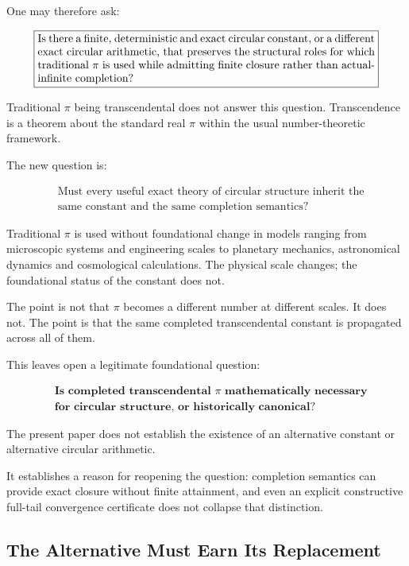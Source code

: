 \documentclass[11pt,a4paper]{article}
\begin{document}
One may therefore ask:

\[
\boxed{
\begin{minipage}{0.88\linewidth}
Is there a finite, deterministic and exact circular constant, or a
different exact circular arithmetic, that preserves the structural
roles for which traditional \(\pi\) is used while admitting finite
closure rather than actual-infinite completion?
\end{minipage}
}
\]

Traditional \(\pi\) being transcendental does not answer this question.
Transcendence is a theorem about the standard real \(\pi\) within the
usual number-theoretic framework.

The new question is:

\[
\boxed{
\begin{aligned}
&\text{Must every useful exact theory of circular structure inherit the}\\
&\text{same constant and the same completion semantics?}
\end{aligned}
}
\]

Traditional \(\pi\) is used without foundational change in models
ranging from microscopic systems and engineering scales to planetary
mechanics, astronomical dynamics and cosmological calculations. The
physical scale changes; the foundational status of the constant does
not.

The point is not that \(\pi\) becomes a different number at different
scales. It does not. The point is that the same completed
transcendental constant is propagated across all of them.

This leaves open a legitimate foundational question:

\[
\boxed{
\begin{aligned}
&\textbf{Is completed transcendental \(\pi\) mathematically necessary}\\
&\textbf{for circular structure, or historically canonical?}
\end{aligned}
}
\]

The present paper does not establish the existence of an alternative
constant or alternative circular arithmetic.

It establishes a reason for reopening the question: completion
semantics can provide exact closure without finite attainment, and
even an explicit constructive full-tail convergence certificate does
not collapse that distinction.


\subsection{The Alternative Must Earn Its Replacement}
\end{document}
